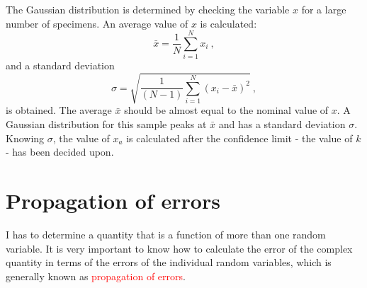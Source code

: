 \documentclass[12pt,a4paper]{article}
\begin{document}
The Gaussian distribution is determined by checking the variable $x$ for a large number of specimens. An average value of $x$ is calculated: 
\begin{equation}
\bar{x} = \frac{1}{N} \sum_{i=1}^N x_i ~,
\end{equation}
and a standard deviation
\begin{equation}
\sigma = \sqrt{\frac{1}{(N-1)} \sum_{i=1}^N (x_i -\bar{x})^2 } ~,
\end{equation}
is obtained.  The average $\bar{x}$ should be almost equal to the nominal value of $x$. A Gaussian distribution for this sample peaks at $\bar{x}$ and has a standard deviation $\sigma$. Knowing $\sigma$, the value of $x_a$ is calculated after the confidence limit - the value of $k$ - has been decided upon.
 
\section{Propagation of errors}
I has to determine a quantity that is a function of more than one random variable. It is very important to know how to calculate the error of the complex quantity in terms of the errors of the individual random variables, which is generally known as \textcolor{red}{propagation of errors}.
\end{document}
